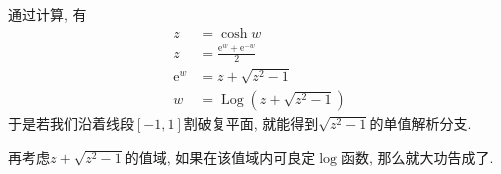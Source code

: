 \documentclass[a4paper,12pt]{ctexart}
\newcommand{\me}{\mathrm{e}}
\DeclareMathOperator{\Log}{Log}
\begin{document}
    \begin{solution}
        通过计算, 有
        \begin{equation}
            \begin{aligned}
                z &= \cosh{w}\\
                z &= \frac{\me^{w}+\me^{-w}}{2}\\
                \me^{w} &= z+\sqrt{z^{2}-1}\\
                w &= \Log{(z+\sqrt{z^{2}-1})}
            \end{aligned}
        \end{equation}
        于是若我们沿着线段$[-1,1]$割破复平面,
        就能得到$\sqrt{z^{2}-1}$的单值解析分支.

        再考虑$z+\sqrt{z^{2}-1}$的值域, 如果在该值域内可良定$\log$函数,
        那么就大功告成了.
    \end{solution}


\end{document}
